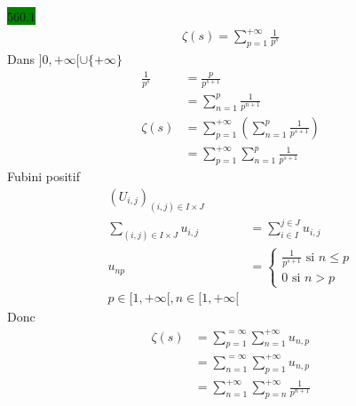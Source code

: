 \documentclass{article}
\begin{document}
\noindent \colorbox{green}{560.1}\\ 
\begin{align*}
    \zeta(s) = \sum_{p=1}^{+\infty} \frac{1}{p^{s}}
\end{align*}
Dans \(]0, +\infty[ \cup \{+\infty\} \)
\begin{align*}
  \frac{1}{p^{s}} &= \frac{p}{p^{s+1}}\\ 
                  &= \sum_{n=1}^{p}\frac{1}{p^{n+1}}\\ 
  \zeta(s) &= \sum_{p=1}^{+\infty}(\sum_{n=1}^{p}\frac{1}{p^{s+1}})\\
          &= \sum_{p=1}^{+\infty} \sum_{n=1}^{p}\frac{1}{p^{s+1}}
\end{align*}
Fubini positif
\begin{align*}
  (U_{i,j})_{(i,j) \in I \times J}\\ 
  \sum_{(i,j) \in I \times J}^{} u_{i,j} &= \sum_{i \in I}^{j \in J} u_{i,j}\\ 
  u_{np} &= 
  \begin{cases}
    \frac{1}{p^{s+1}} \text{ si } n \leq p \\ 
    0 \text{ si } n > p
  \end{cases}\\
  p \in [1, +\infty[, n \in [1, +\infty[
\end{align*}
Donc 
\begin{align*}
  \zeta(s) &= \sum_{p=1}^{=\infty}\sum_{n=1}^{+\infty} u_{n,p}\\ 
           &= \sum_{n=1}^{=\infty}\sum_{p=1}^{+\infty} u_{n,p}\\ 
           &= \sum_{n=1}^{+\infty} \sum_{p=n}^{+\infty} \frac{1}{p^{n+1}}
\end{align*}
\end{document}

